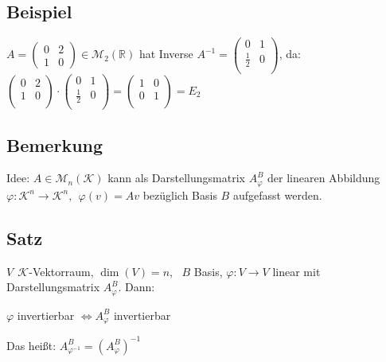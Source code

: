 \documentclass[12pt,titlepage, pdf]{article}
\newcommand{\R}{\mathds{R}}
\newcommand{\K}{\mathcal{K}}
\newcommand{\M}{\mathcal{M}}
\renewcommand{\>}{\rightarrow}
\renewcommand{\*}{\cdot}
\renewcommand{\phi}{\varphi}
\begin{document}
\subsection{Beispiel}
$A = \begin{pmatrix}
0 & 2 \\
1 & 0
\end{pmatrix}\in\M_2(\R)$ hat Inverse $A^{-1} =  \begin{pmatrix}
0 & 1 \\
\frac{1}{2} & 0\\
\end{pmatrix}$, da:\\
$\begin{pmatrix}
0 & 2 \\
1 & 0 \\
\end{pmatrix} \cdot \begin{pmatrix}
0 & 1 \\
\frac{1}{2} & 0 \\
\end{pmatrix} = \begin{pmatrix}
1 & 0  \\
0 & 1 \\
\end{pmatrix} = E_2$
\subsection{Bemerkung}
\label{7.14}
Idee: $A \in \M_n(\K)$ kann als Darstellungsmatrix $A_\phi^B$ der linearen Abbildung $\phi: \K^n \rightarrow \K^n,~~ \phi(v) = Av$ bezüglich Basis $B$ aufgefasst werden.
\subsection{Satz}
\label{7.15}
$V~~\K$-Vektorraum, $\dim(V) = n,~~~ B$ Basis, $\phi: V \rightarrow V$ linear mit Darstellungsmatrix $A_\phi^B$. Dann:
\begin{center}
	$\phi$ invertierbar $\Leftrightarrow A^B_\phi$ invertierbar
\end{center}
Das heißt:  $A_{\phi^{-1}}^B = (A_\phi^B)^{-1}$
\end{document}
